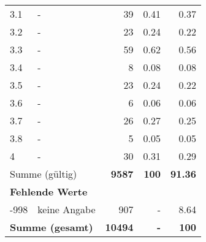 \begin{longtable}{lXrrr}
        3.1 & \multicolumn{1}{X}{-} & %
          \num{39} &
          \num[round-mode=places,round-precision=2]{0.41} &
          \num[round-mode=places,round-precision=2]{0.37} \\

        3.2 & \multicolumn{1}{X}{-} & %
          \num{23} &
          \num[round-mode=places,round-precision=2]{0.24} &
          \num[round-mode=places,round-precision=2]{0.22} \\

        3.3 & \multicolumn{1}{X}{-} & %
          \num{59} &
          \num[round-mode=places,round-precision=2]{0.62} &
          \num[round-mode=places,round-precision=2]{0.56} \\

        3.4 & \multicolumn{1}{X}{-} & %
          \num{8} &
          \num[round-mode=places,round-precision=2]{0.08} &
          \num[round-mode=places,round-precision=2]{0.08} \\

        3.5 & \multicolumn{1}{X}{-} & %
          \num{23} &
          \num[round-mode=places,round-precision=2]{0.24} &
          \num[round-mode=places,round-precision=2]{0.22} \\

        3.6 & \multicolumn{1}{X}{-} & %
          \num{6} &
          \num[round-mode=places,round-precision=2]{0.06} &
          \num[round-mode=places,round-precision=2]{0.06} \\

        3.7 & \multicolumn{1}{X}{-} & %
          \num{26} &
          \num[round-mode=places,round-precision=2]{0.27} &
          \num[round-mode=places,round-precision=2]{0.25} \\

        3.8 & \multicolumn{1}{X}{-} & %
          \num{5} &
          \num[round-mode=places,round-precision=2]{0.05} &
          \num[round-mode=places,round-precision=2]{0.05} \\

        4 & \multicolumn{1}{X}{-} & %
          \num{30} &
          \num[round-mode=places,round-precision=2]{0.31} &
          \num[round-mode=places,round-precision=2]{0.29} \\

     \midrule
     \multicolumn{2}{l}{Summe (gültig)} &
       \textbf{\num{9587}} &
     \textbf{\num{100}} &
       \textbf{\num[round-mode=places,round-precision=2]{91.36}} \\
     \multicolumn{5}{l}{\textbf{Fehlende Werte}}\\
       -998 &
       keine Angabe &
         \num{907} &
        - &
         \num[round-mode=places,round-precision=2]{8.64} \\
     \midrule
     \multicolumn{2}{l}{\textbf{Summe (gesamt)}} &
          \textbf{\num{10494}} &
        \textbf{-} &
        \textbf{\num{100}} \\
     \bottomrule
     \end{longtable}
     
